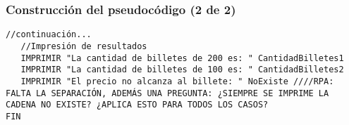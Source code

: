 \documentclass{beamer}
\begin{document}
\begin{frame}[fragile] %
\frametitle{Construcción del pseudocódigo (2 de 2)}
\begin{lstlisting}[language=algoritmialanguage,firstnumber=32]
   //continuación...
   //Impresión de resultados
   IMPRIMIR "La cantidad de billetes de 200 es: " CantidadBilletes1
   IMPRIMIR "La cantidad de billetes de 100 es: " CantidadBilletes2
   IMPRIMIR "El precio no alcanza al billete: " NoExiste ////RPA: FALTA LA SEPARACIÓN, ADEMÁS UNA PREGUNTA: ¿SIEMPRE SE IMPRIME LA CADENA NO EXISTE? ¿APLICA ESTO PARA TODOS LOS CASOS?
FIN 
\end{lstlisting}
\end{frame}





\end{document}
